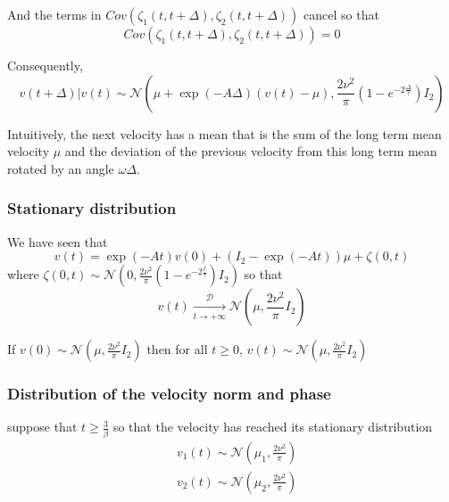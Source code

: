 \documentclass[11pt]{article}
\newcommand {\1}{\mathbb{1}}
\begin{document}
And the terms in $Cov(\zeta_1(t,t+\Delta),\zeta_2(t,t+\Delta))$ cancel so that 
\[
Cov(\zeta_1(t,t+\Delta),\zeta_2(t,t+\Delta))=0
\]

Consequently, 
\[v(t+\Delta) \vert v(t) \sim \mathcal{N}\left( \mu + \exp(-A\Delta)(v(t)-\mu), \frac{2\nu^2}{\pi}(1-e^{-2\frac{\Delta}{\tau}}) I_2 \right) \]

Intuitively, the next velocity has a mean that is the sum of the long term mean velocity $\mu$ and the deviation of the previous velocity from this long term mean rotated by an angle $\omega \Delta$.
\subsubsection{Stationary distribution}

We have seen that 
\[v(t)=\exp(-At) v(0)+(I_2-\exp(-At))\mu + \zeta(0,t)\]
where $\zeta(0,t) \sim \mathcal{N} \left(0, \frac{2\nu^2}{\pi} (1-e^{-2\frac{t}{\tau}}) I_2 \right) $ so that 
\[v(t) \underset{t \rightarrow +\infty}{\overset{\mathcal{D}}{\longrightarrow}}\mathcal{N}\left(\mu,\frac{2\nu^2}{\pi} I_2 \right) \]

If $v(0) \sim \mathcal{N}\left(\mu,\frac{2\nu^2}{\pi} I_2\right)$ then for all $t \geq 0$, $v(t) \sim \mathcal{N}\left(\mu,\frac{2\nu^2}{\pi} I_2\right)$

\subsubsection{Distribution of the velocity norm and phase}

suppose that $t\geq \frac{3}{\beta}$ so that the velocity has reached its stationary distribution
\begin{align*}
	&v_1(t) \sim \mathcal{N}\left(\mu_1, \frac{2\nu^2}{\pi}\right) \\
	&v_2(t) \sim \mathcal{N}\left(\mu_2, \frac{2\nu^2}{\pi}\right)
\end{align*}
\end{document}
